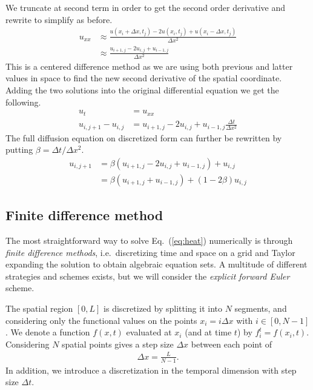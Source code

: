 \documentclass[a4paper, twocolumn]{article}
\newcommand{\eq} [1]{Eq.\ (\ref{eq:#1})}
\begin{document}
We truncate at second term in order to get the second order derivative and rewrite to simplify as before. 
\begin{align*}
u_{xx} &\approx \frac{u(x_i + \Delta x,t_j) - 2u(x_i,t_j) + u(x_i - \Delta x,t_j)}{\Delta x^2} \\
&\approx \frac{u_{i+1, j} - 2u_{i,j} + u_{i-1,j}}{\Delta x^2}
\end{align*}
This is a centered difference method as we are using both previous and latter values in space to find the new second derivative of the spatial coordinate.
Adding the two solutions into the original differential equation we get the following. 
\begin{align*}
u_t &= u_{xx} \\
u_{i,j+1} - u_{i,j} &= u_{i+1,j} - 2u_{i,j} + u_{i-1,j} \frac{\Delta t}{\Delta x^2}
\end{align*}
The full diffusion equation on discretized form can further be rewritten by putting $\beta = \Delta t / \Delta x^2$.
\begin{align*}
u_{i, j+1} &= \beta (u_{i+1,j} - 2u_{i,j} + u_{i-1,j}) + u_{i,j} \\
&= \beta (u_{i+1,j} + u_{i-1,j}) + (1 - 2\beta)u_{i,j} 
\end{align*}

\subsection{Finite difference method} \label{sect:finitediff}
The most straightforward way to solve \eq{heat} numerically is through \textit{finite difference methods}, i.e.\ discretizing time and space on a grid and Taylor expanding the solution to obtain algebraic equation sets. A multitude of different strategies and schemes exists, but we will consider the \textit{explicit forward Euler} scheme. 

The spatial region $[0,L]$ is discretized by splitting it into $N$ segments, and considering only the functional values on the points $x_i=i\Delta x$ with $i\in[0,N-1]$. We denote a function $f(x,t)$ evaluated at $x_i$ (and at time $t$) by $f_i^t=f(x_i,t)$. Considering $N$ spatial points gives a step size $\Delta x$ between each point of 
\begin{align}
\Delta x = \frac{L}{N-1}.
\end{align}
In addition, we introduce a discretization in the temporal dimension with step size $\Delta t$. 
\end{document}
